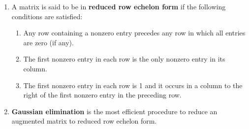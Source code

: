 \documentclass[10pt]{article}
\begin{document}
\begin{multicols*}{2}
\begin{enumerate}
\begin{enumerate}
        \item A matrix is said to be in \textbf{reduced row echelon form} if the following conditions are satisfied:
        \begin{enumerate}
            \item Any row containing a nonzero entry precedes any row in which all entries are zero (if any).
            \item The first nonzero entry in each row is the only nonzero entry in its column.
            \item The first nonzero entry in each row is 1 and it occurs in a column to the right of the first nonzero entry in the preceding row.
        \end{enumerate}
        \item \textbf{Gaussian elimination} is the most efficient procedure to reduce an augmented matrix to reduced row echelon form. 
    \end{enumerate}
    

\end{enumerate}
\end{multicols*}
\end{document}
